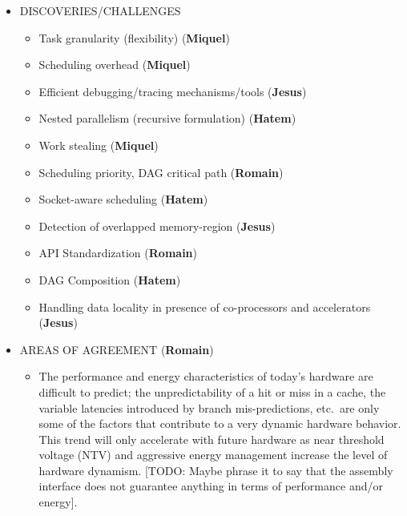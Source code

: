 \begin{itemize}
	\item DISCOVERIES/CHALLENGES
	\begin{itemize}
		\item Task granularity (flexibility) (\textbf{Miquel})
		\item Scheduling overhead (\textbf{Miquel})
		\item Efficient debugging/tracing mechanisms/tools (\textbf{Jesus})
		\item Nested parallelism (recursive formulation) (\textbf{Hatem})
		\item Work stealing (\textbf{Miquel})
		\item Scheduling priority, DAG critical path  (\textbf{Romain})
		\item Socket-aware scheduling (\textbf{Hatem})
		\item Detection of overlapped memory-region (\textbf{Jesus})
		\item API Standardization (\textbf{Romain})
		\item DAG Composition (\textbf{Hatem})
		\item Handling data locality in presence of co-processors and accelerators (\textbf{Jesus})
	\end{itemize}



	\item AREAS OF AGREEMENT (\textbf{Romain})
          \begin{itemize}
          \item{
              The performance and energy characteristics of today's
hardware are difficult to predict; the unpredictability of a hit or
miss in a cache, the variable latencies introduced by branch
mis-predictions, etc.\ are only some of the factors that contribute to
a very dynamic hardware behavior. This trend will only accelerate with
future hardware as near threshold voltage (NTV) and aggressive energy
management increase the level of hardware dynamism. [TODO: Maybe
phrase it to say that the assembly interface does not guarantee
anything in terms of performance and/or energy].

}
\end{itemize}
\end{itemize}
